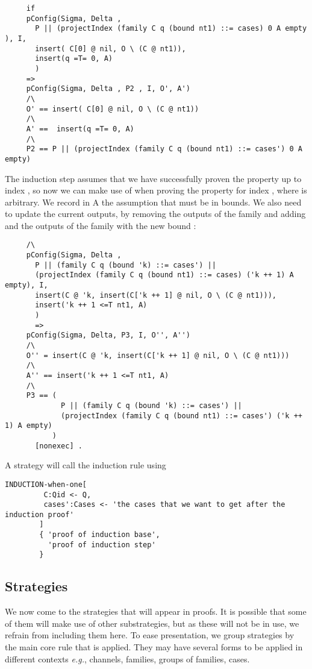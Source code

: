 \begin{lstlisting}
     if 
     pConfig(Sigma, Delta , 
       P || (projectIndex (family C q (bound nt1) ::= cases) 0 A empty ), I, 
       insert( C[0] @ nil, O \ (C @ nt1)), 
       insert(q =T= 0, A)
       ) 
     => 
     pConfig(Sigma, Delta , P2 , I, O', A')
     /\
     O' == insert( C[0] @ nil, O \ (C @ nt1))
     /\
     A' ==  insert(q =T= 0, A) 
     /\
     P2 == P || (projectIndex (family C q (bound nt1) ::= cases') 0 A empty)
\end{lstlisting}
The induction step assumes that we have successfully proven the 
property up to index , so now we can
make use of  when proving the
property for index , where \code{'k} is arbitrary.
We record in A the assumption that \code{'k + 1} must be in bounds. 
We also need to update the current outputs, by removing the outputs of the family  and adding  and the outputs of the family  with the new bound :
\begin{lstlisting}     
     /\
     pConfig(Sigma, Delta , 
       P || (family C q (bound 'k) ::= cases') || 
       (projectIndex (family C q (bound nt1) ::= cases) ('k ++ 1) A empty), I, 
       insert(C @ 'k, insert(C['k ++ 1] @ nil, O \ (C @ nt1))), 
       insert('k ++ 1 <=T nt1, A)
       )
       =>
     pConfig(Sigma, Delta, P3, I, O'', A'')
     /\
     O'' = insert(C @ 'k, insert(C['k ++ 1] @ nil, O \ (C @ nt1)))
     /\
     A'' == insert('k ++ 1 <=T nt1, A) 
     /\
     P3 == (
             P || (family C q (bound 'k) ::= cases') ||
             (projectIndex (family C q (bound nt1) ::= cases') ('k ++ 1) A empty)
           )
       [nonexec] . 
\end{lstlisting}

A strategy will call the induction rule using
\begin{lstlisting}
INDUCTION-when-one[
         C:Qid <- Q, 
         cases':Cases <- 'the cases that we want to get after the induction proof'
        ]
        { 'proof of induction base',
          'proof of induction step'        
        }
\end{lstlisting}

\subsection{Strategies}

We now come to the strategies that will appear in proofs. It is possible that some of them will make use of other substrategies, but as these will not be in use, we refrain from including them here. To ease presentation,
we group strategies by the main core rule that is applied. They may 
have several forms to be applied in different contexts  
\emph{e.g.}, channels, families, groups of families, cases.

